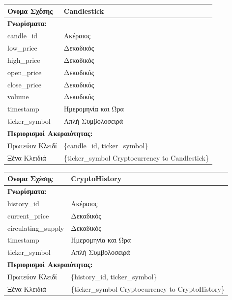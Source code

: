 \noindent
\begin{tabular}{|p{6cm}|p{6cm}|}
\hline
\textbf{Όνομα Σχέσης} & Candlestick \\ \hline

\multicolumn{2}{|l|}{\textbf{Γνωρίσματα:}} \\ \hline
candle\_id & Ακέραιος \\ \hline
low\_price & Δεκαδικός  \\ \hline
high\_price & Δεκαδικός  \\ \hline
open\_price & Δεκαδικός \\ \hline
close\_price & Δεκαδικός  \\ \hline
volume & Δεκαδικός \\ \hline
timestamp & Ημερομηνία και Ώρα \\ \hline
ticker\_symbol & Απλή Συμβολοσειρά \\ \hline

\multicolumn{2}{|l|}{\textbf{Περιορισμοί Ακεραιότητας:}} \\ \hline
Πρωτεύον Κλειδί & \{candle\_id, ticker\_symbol\} \\ \hline
Ξένα Κλειδιά & \{ticker\_symbol Cryptocurrency to Candlestick\} \\ \hline
\end{tabular}

\vspace{1cm}

\noindent
\begin{tabular}{|p{6cm}|p{6cm}|}
\hline
\textbf{Όνομα Σχέσης} & CryptoHistory \\ \hline

\multicolumn{2}{|l|}{\textbf{Γνωρίσματα:}} \\ \hline
history\_id & Ακέραιος \\ \hline
current\_price & Δεκαδικός \\ \hline
circulating\_supply & Δεκαδικός \\ \hline
timestamp & Ημερομηνία και Ώρα \\ \hline
ticker\_symbol & Απλή Συμβολοσειρά \\ \hline

\multicolumn{2}{|l|}{\textbf{Περιορισμοί Ακεραιότητας:}} \\ \hline
Πρωτεύον Κλειδί & \{history\_id, ticker\_symbol\} \\ \hline
Ξένα Κλειδιά & \{ticker\_symbol Cryptocurrency 
to CryptoHistory\} \\ \hline
\end{tabular}


